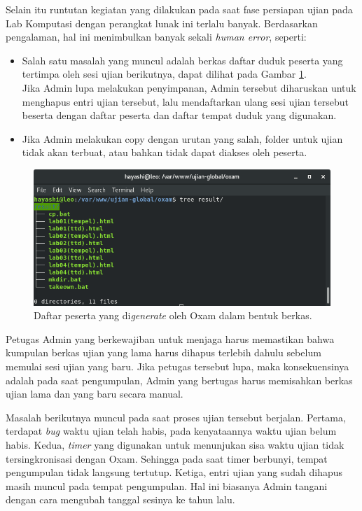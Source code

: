 Selain itu runtutan kegiatan yang dilakukan pada saat fase persiapan ujian pada Lab Komputasi dengan perangkat lunak ini terlalu banyak. Berdasarkan pengalaman, hal ini menimbulkan banyak sekali \textit{human error}, seperti:
    \begin{itemize}
        \item Salah satu masalah yang muncul adalah berkas daftar duduk peserta yang tertimpa oleh sesi ujian berikutnya, dapat dilihat pada Gambar \ref{fig:ss-folder-gen}.\\
        Jika Admin lupa melakukan penyimpanan, Admin tersebut diharuskan untuk menghapus entri ujian tersebut, lalu mendaftarkan ulang sesi ujian tersebut beserta dengan daftar peserta dan daftar tempat duduk yang digunakan.
        \item Jika Admin melakukan copy dengan urutan yang salah, folder untuk ujian tidak akan terbuat, atau bahkan tidak dapat diakses oleh peserta.
        
    \end{itemize}

\begin{figure}
    \centering
    \includegraphics[width=0.7\paperwidth]{Gambar/ss-struktur-folder-generator.png}
    \caption{Daftar peserta yang di\textit{generate} oleh Oxam dalam bentuk berkas.}
    \label{fig:ss-folder-gen}
\end{figure}

Petugas Admin yang berkewajiban untuk menjaga harus memastikan bahwa kumpulan berkas ujian yang lama harus dihapus terlebih dahulu sebelum memulai sesi ujian yang baru. Jika petugas tersebut lupa, maka konsekuensinya adalah pada saat pengumpulan, Admin yang bertugas harus memisahkan berkas ujian lama dan yang baru secara manual.

Masalah berikutnya muncul pada saat proses ujian tersebut berjalan. Pertama, terdapat \textit{bug} waktu ujian telah habis, pada kenyataannya waktu ujian belum habis. Kedua, \textit{timer} yang digunakan untuk menunjukan sisa waktu ujian tidak tersingkronisasi dengan Oxam. Sehingga pada saat timer berbunyi, tempat pengumpulan tidak langsung tertutup. Ketiga, entri ujian yang sudah dihapus masih muncul pada tempat pengumpulan. Hal ini biasanya Admin tangani dengan cara mengubah tanggal sesinya ke tahun lalu.

